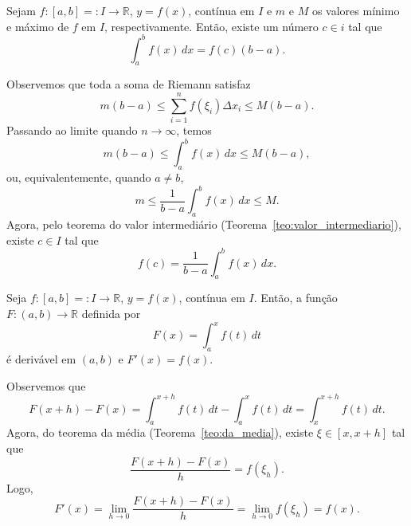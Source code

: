\begin{teo}\label{teo:da_media}
  Sejam $f:[a,b]=:I\to\mathbb{R}$, $y=f(x)$, contínua em $I$ e $m$ e $M$ os valores mínimo e máximo de $f$ em $I$, respectivamente. Então, existe um número $c\in i$ tal que
  \begin{equation}
    \int_a^b f(x)\,dx = f(c)(b-a).
  \end{equation}
\end{teo}
\begin{dem}
  Observemos que toda a soma de Riemann satisfaz
  \begin{equation}
    m(b-a) \leq \sum_{i=1}^n f(\xi_i)\Delta x_i \leq M(b-a).
  \end{equation}
Passando ao limite quando $n\to \infty$, temos
\begin{equation}
    m(b-a) \leq \int_a^b f(x)\,dx \leq M(b-a),
\end{equation}
ou, equivalentemente, quando $a\neq b$,
\begin{equation}
    m \leq \frac{1}{b-a}\int_a^b f(x)\,dx \leq M.
\end{equation}
Agora, pelo teorema do valor intermediário (Teorema~\ref{teo:valor_intermediario}), existe $c\in I$ tal que
\begin{equation}
  f(c) = \frac{1}{b-a}\int_a^b f(x)\,dx.
\end{equation}
\end{dem}

\begin{teo}\label{teo:teo_fundamental_do_calculo}
  Seja $f:[a, b]=:I\to\mathbb{R}$, $y=f(x)$, contínua em $I$. Então, a função $F:(a, b)\to\mathbb{R}$ definida por
  \begin{equation}
    F(x) = \int_a^x f(t)\,dt
  \end{equation}
é derivável em $(a, b)$ e $F'(x) = f(x)$.
\end{teo}
\begin{dem}
  Observemos que
  \begin{equation}
    F(x+h)-F(x) = \int_{a}^{x+h}f(t)\,dt - \int_{a}^x f(t)\,dt = \int_x^{x+h}f(t)\,dt.
  \end{equation}
Agora, do teorema da média (Teorema~\ref{teo:da_media}), existe $\xi \in [x, x+h]$ tal que
\begin{equation}
  \frac{F(x+h)-F(x)}{h} = f(\xi_{h}).
\end{equation}
Logo,
\begin{equation}
  F'(x) = \lim_{h\to 0}\frac{F(x+h)-F(x)}{h} = \lim_{h\to 0}f(\xi_{h}) = f(x).
\end{equation}
\end{dem}

